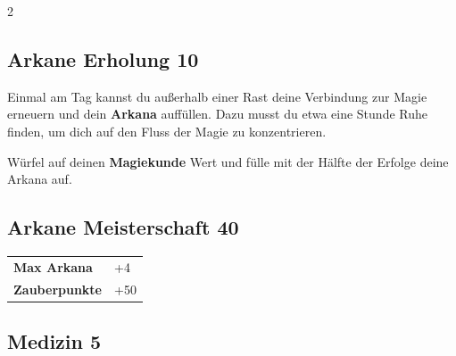\begin{multicols}{2}
\begin{tcolorbox}

\end{tcolorbox}

\begin{tcolorbox}
    \subsection*{Arkane Erholung \hfill \small{10 }}
    \tcblower
Einmal am Tag kannst du außerhalb einer Rast deine Verbindung zur Magie erneuern und dein \textbf{Arkana} auffüllen. Dazu musst du etwa eine Stunde Ruhe finden, um dich auf den Fluss der Magie zu konzentrieren.

Würfel auf deinen \textbf{Magiekunde} Wert und fülle mit der Hälfte der Erfolge deine Arkana auf.


\vspace{3mm}



\end{tcolorbox}

\begin{tcolorbox}
    \subsection*{Arkane Meisterschaft \hfill \small{40 }}
    \tcblower




\begin{tabular}{@{}ll@{}}
    \textbf{Max Arkana} & +4\\
    \textbf{Zauberpunkte} & +50\\
\end{tabular}


\end{tcolorbox}

\begin{tcolorbox}
    \subsection*{Medizin \hfill \small{5 }}
    \tcblower





\end{tcolorbox}
\end{multicols}
